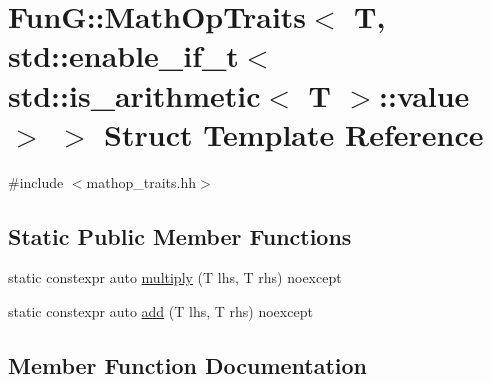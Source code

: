 \hypertarget{structFunG_1_1MathOpTraits_3_01T_00_01std_1_1enable__if__t_3_01std_1_1is__arithmetic_3_01T_01_4_1_1value_01_4_01_4}{}\section{FunG\+:\+:Math\+Op\+Traits$<$ T, std\+:\+:enable\+\_\+if\+\_\+t$<$ std\+:\+:is\+\_\+arithmetic$<$ T $>$\+:\+:value $>$ $>$ Struct Template Reference}
\label{structFunG_1_1MathOpTraits_3_01T_00_01std_1_1enable__if__t_3_01std_1_1is__arithmetic_3_01T_01_4_1_1value_01_4_01_4}


{\ttfamily \#include $<$mathop\+\_\+traits.\+hh$>$}

\subsection*{Static Public Member Functions}
\begin{DoxyCompactItemize}
\item 
static constexpr auto \hyperlink{structFunG_1_1MathOpTraits_3_01T_00_01std_1_1enable__if__t_3_01std_1_1is__arithmetic_3_01T_01_4_1_1value_01_4_01_4_ac0a15812b088ab59de75d84bd2133489}{multiply} (T lhs, T rhs) noexcept
\item 
static constexpr auto \hyperlink{structFunG_1_1MathOpTraits_3_01T_00_01std_1_1enable__if__t_3_01std_1_1is__arithmetic_3_01T_01_4_1_1value_01_4_01_4_acab509051d7a95f0d58f495641ac9845}{add} (T lhs, T rhs) noexcept
\end{DoxyCompactItemize}


\subsection{Member Function Documentation}
